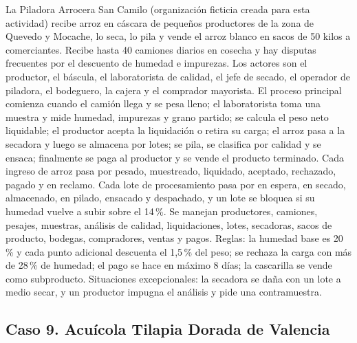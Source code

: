 \documentclass[11pt]{article}
\newcommand{\subseccion}[1]{\subsection{\textcolor{midblue}{#1}}}
\begin{document}
La Piladora Arrocera San Camilo (organización ficticia creada para esta actividad) recibe arroz en cáscara de pequeños productores de la zona de Quevedo y Mocache, lo seca, lo pila y vende el arroz blanco en sacos de 50 kilos a comerciantes. Recibe hasta 40 camiones diarios en cosecha y hay disputas frecuentes por el descuento de humedad e impurezas. Los actores son el productor, el báscula, el laboratorista de calidad, el jefe de secado, el operador de piladora, el bodeguero, la cajera y el comprador mayorista. El proceso principal comienza cuando el camión llega y se pesa lleno; el laboratorista toma una muestra y mide humedad, impurezas y grano partido; se calcula el peso neto liquidable; el productor acepta la liquidación o retira su carga; el arroz pasa a la secadora y luego se almacena por lotes; se pila, se clasifica por calidad y se ensaca; finalmente se paga al productor y se vende el producto terminado. Cada ingreso de arroz pasa por pesado, muestreado, liquidado, aceptado, rechazado, pagado y en reclamo. Cada lote de procesamiento pasa por en espera, en secado, almacenado, en pilado, ensacado y despachado, y un lote se bloquea si su humedad vuelve a subir sobre el 14\,\%. Se manejan productores, camiones, pesajes, muestras, análisis de calidad, liquidaciones, lotes, secadoras, sacos de producto, bodegas, compradores, ventas y pagos. Reglas: la humedad base es 20\,\% y cada punto adicional descuenta el 1,5\,\% del peso; se rechaza la carga con más de 28\,\% de humedad; el pago se hace en máximo 8 días; la cascarilla se vende como subproducto. Situaciones excepcionales: la secadora se daña con un lote a medio secar, y un productor impugna el análisis y pide una contramuestra.

\subseccion{Caso 9. Acuícola Tilapia Dorada de Valencia}
\end{document}
